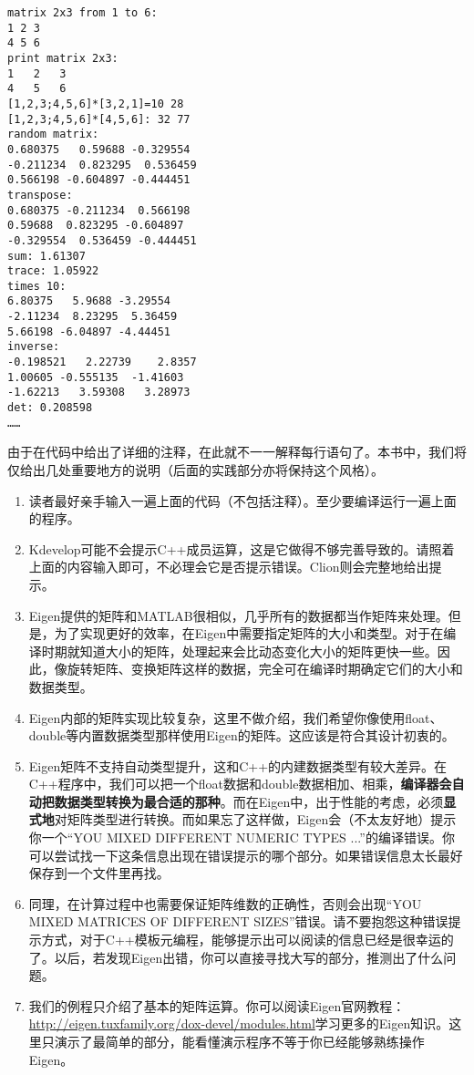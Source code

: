 \begin{lstlisting}[caption=终端输入：]
% build/eigenMatrix
matrix 2x3 from 1 to 6: 
1 2 3
4 5 6
print matrix 2x3: 
1	2	3	
4	5	6	
[1,2,3;4,5,6]*[3,2,1]=10 28
[1,2,3;4,5,6]*[4,5,6]: 32 77
random matrix: 
0.680375   0.59688 -0.329554
-0.211234  0.823295  0.536459
0.566198 -0.604897 -0.444451
transpose: 
0.680375 -0.211234  0.566198
0.59688  0.823295 -0.604897
-0.329554  0.536459 -0.444451
sum: 1.61307
trace: 1.05922
times 10: 
6.80375   5.9688 -3.29554
-2.11234  8.23295  5.36459
5.66198 -6.04897 -4.44451
inverse: 
-0.198521   2.22739    2.8357
1.00605 -0.555135  -1.41603
-1.62213   3.59308   3.28973
det: 0.208598
……
\end{lstlisting}

由于在代码中给出了详细的注释，在此就不一一解释每行语句了。本书中，我们将仅给出几处重要地方的说明（后面的实践部分亦将保持这个风格）。

\begin{enumerate}
	\item 读者最好亲手输入一遍上面的代码（不包括注释）。至少要编译运行一遍上面的程序。
	
	\item Kdevelop可能不会提示C++成员运算，这是它做得不够完善导致的。请照着上面的内容输入即可，不必理会它是否提示错误。Clion则会完整地给出提示。
	
	\item Eigen提供的矩阵和MATLAB很相似，几乎所有的数据都当作矩阵来处理。但是，为了实现更好的效率，在Eigen中需要指定矩阵的大小和类型。对于在编译时期就知道大小的矩阵，处理起来会比动态变化大小的矩阵更快一些。因此，像旋转矩阵、变换矩阵这样的数据，完全可在编译时期确定它们的大小和数据类型。
	
	\item Eigen内部的矩阵实现比较复杂，这里不做介绍，我们希望你像使用float、double等内置数据类型那样使用Eigen的矩阵。这应该是符合其设计初衷的。
	
	\item Eigen矩阵不支持自动类型提升，这和C++的内建数据类型有较大差异。在C++程序中，我们可以把一个float数据和double数据相加、相乘，\textbf{编译器会自动把数据类型转换为最合适的那种}。而在Eigen中，出于性能的考虑，必须\textbf{显式地}对矩阵类型进行转换。而如果忘了这样做，Eigen会（不太友好地）提示你一个“YOU MIXED DIFFERENT NUMERIC TYPES ...”的编译错误。你可以尝试找一下这条信息出现在错误提示的哪个部分。如果错误信息太长最好保存到一个文件里再找。
	
	\item 同理，在计算过程中也需要保证矩阵维数的正确性，否则会出现“YOU MIXED MATRICES OF DIFFERENT SIZES”错误。请不要抱怨这种错误提示方式，对于C++模板元编程，能够提示出可以阅读的信息已经是很幸运的了。以后，若发现Eigen出错，你可以直接寻找大写的部分，推测出了什么问题。
	
	\item 我们的例程只介绍了基本的矩阵运算。你可以阅读Eigen官网教程：\\{\url{http://eigen.tuxfamily.org/dox-devel/modules.html}}学习更多的Eigen知识。这里只演示了最简单的部分，能看懂演示程序不等于你已经能够熟练操作Eigen。
\end{enumerate}

